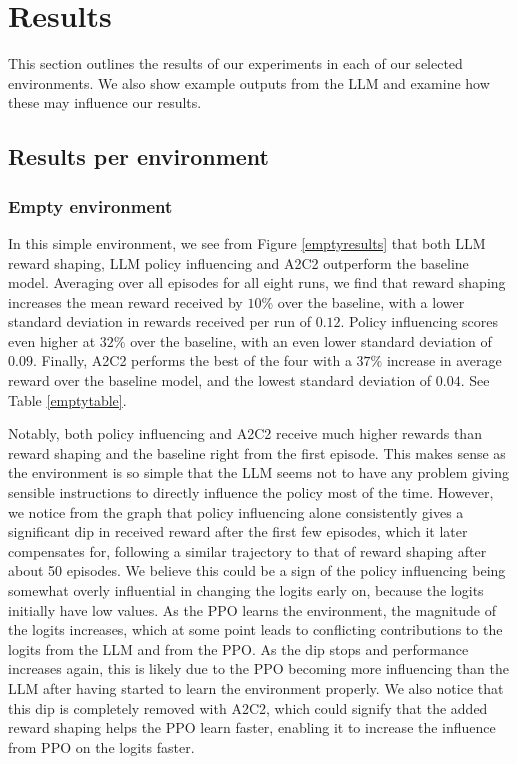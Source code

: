\documentclass[conference]{IEEEtran}
\begin{document}
\section{Results}

This section outlines the results of our experiments in each of our selected environments. We also show example outputs from the LLM and examine how these may influence our results.

\subsection{Results per environment}

\subsubsection{Empty environment}
\label{emptyresultstext}

In this simple environment, we see from Figure \ref{emptyresults} that both LLM reward shaping, LLM policy influencing and A2C2 outperform the baseline model. Averaging over all episodes for all eight runs, we find that reward shaping increases the mean reward received by $10\%$ over the baseline, with a lower standard deviation in rewards received per run of $0.12$. Policy influencing scores even higher at $32\%$ over the baseline, with an even lower standard deviation of $0.09$. Finally, A2C2 performs the best of the four with a $37\%$ increase in average reward over the baseline model, and the lowest standard deviation of $0.04$. See Table \ref{emptytable}.

Notably, both policy influencing and A2C2 receive much higher rewards than reward shaping and the baseline right from the first episode. This makes sense as the environment is so simple that the LLM seems not to have any problem giving sensible instructions to directly influence the policy most of the time. However, we notice from the graph that policy influencing alone consistently gives a significant dip in received reward after the first few episodes, which it later compensates for, following a similar trajectory to that of reward shaping after about 50 episodes. We believe this could be a sign of the policy influencing being somewhat overly influential in changing the logits early on, because the logits initially have low values. As the PPO learns the environment, the magnitude of the logits increases, which at some point leads to conflicting contributions to the logits from the LLM and from the PPO. As the dip stops and performance increases again, this is likely due to the PPO becoming more influencing than the LLM after having started to learn the environment properly. We also notice that this dip is completely removed with A2C2, which could signify that the added reward shaping helps the PPO learn faster, enabling it to increase the influence from PPO on the logits faster.
\end{document}
